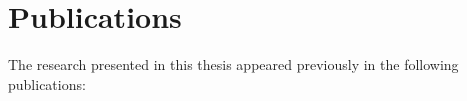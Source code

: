 \chapter{Publications}
\label{apx:publications}

The research presented in this thesis appeared previously in
the following publications:

\begin{refsection}
    \nocite{DBLP:conf/alenex/AngrimanBDGGM21}
    \nocite{DBLP:conf/alenex/AngrimanGBZGM20}

    \nocite{DBLP:conf/alenex/BiseniusBAM18}

    \nocite{DBLP:conf/bigdataconf/AngrimanGM19}
    \nocite{DBLP:conf/esa/AngrimanPGM20}
    \nocite{DBLP:conf/europar/GrintenAM19}
    \nocite{DBLP:conf/sdm/GrintenAPM21}
    \nocite{DBLP:journals/algorithms/AngrimanGLMNPT19}
    \nocite{DBLP:journals/it/GrintenAM20}

    \printbibliography[heading=subbibliography,heading=none]
\end{refsection}

